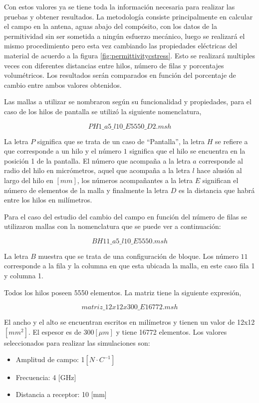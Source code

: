\documentclass[12pt,letterpaper]{article}
\numberwithin{equation}{section}
\begin{document}
Con estos valores ya se tiene toda la información necesaria para realizar las pruebas y obtener resultados. La metodología consiste principalmente en calcular el campo en la antena, aguas abajo del compósito, con los datos de la permitividad sin ser sometida a ningún esfuerzo mecánico, luego se realizará el mismo procedimiento pero esta vez cambiando las propiedades eléctricas del material de acuerdo a la figura \ref{fig:permittivitycstress}. Esto se realizará multiples veces con diferentes distancias entre hilos, número de filas y porcentajes volumétricos. Los resultados serán comparados en función del porcentaje de cambio entre ambos valores obtenidos.

Las mallas a utilizar se nombraron según su funcionalidad y propiedades, para el caso de los hilos de pantalla se utilizó la siguiente nomenclatura,

$$PH1\_a5\_l10\_E5550\_D2.msh$$

La letra $P$ significa que se trata de un caso de ``Pantalla'', la letra $H$ se refiere a que corresponde a un hilo y el número $1$ significa que el hilo se encuentra en la posición 1 de la pantalla. El número que acompaña a la letra $a$ corresponde al radio del hilo en micrómetros, aquel que acompaña a la letra $l$ hace alusión al largo del hilo en $[mm]$, los números acompañantes a la letra $E$ significan el número de elementos de la malla y finalmente la letra $D$ es la distancia que habrá entre los hilos en milímetros.

Para el caso del estudio del cambio del campo en función del número de filas se utilizaron mallas con la nomenclatura que se puede ver a continuación: 

$$BH11\_a5\_l10\_E5550.msh$$

La letra $B$ muestra que se trata de una configuración de bloque. Los número $11$ corresponde a la fila y la columna en que esta ubicada la malla, en este caso fila 1 y columna 1.

Todos los hilos poseen 5550 elementos. La matriz tiene la siguiente expresión,

$$matriz\_12x12x300\_E16772.msh$$

El ancho y el alto se encuentran escritos en milímetros y tienen un valor de 12x12 $[mm^2]$. El espesor es de 300$[\mu m]$ y tiene 16772 elementos. Los valores seleccionados para realizar las simulaciones son:

\begin{itemize}
	\item Amplitud de campo: 1$[N\cdot C^{-1}]$
	\item Frecuencia: 4 [GHz]
	\item Distancia a receptor: 10 [mm]
\end{itemize}
\end{document}
